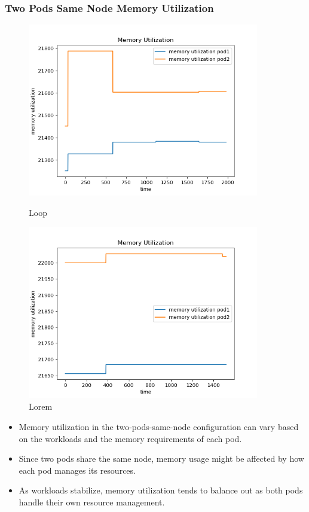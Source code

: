 \newpage
\subsubsection{Two Pods Same Node Memory Utilization}
\begin{figure}[h]
    \begin{minipage}[t]{0.5\textwidth}
        \centering
        \includegraphics[width=0.9\textwidth]{../sample_results/loop/two-pod-same-node/mem-utilization-two-pod-same-node.png}
        \caption{Loop}
    \end{minipage}
    \hfill
    \begin{minipage}[t]{0.5\textwidth}
        \centering
        \includegraphics[width=0.9\textwidth]{../sample_results/lorem/two-pod-same-node/mem-utilization-two-pod-same-node.png}
        \caption{Lorem}
    \end{minipage}
\end{figure}

\begin{itemize}
    \item Memory utilization in the two-pods-same-node configuration can vary based on the workloads and the memory requirements of each pod.
    \item Since two pods share the same node, memory usage might be affected by how each pod manages its resources.
    \item As workloads stabilize, memory utilization tends to balance out as both pods handle their own resource management.
\end{itemize}

